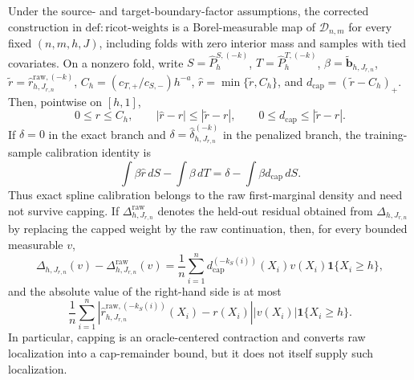 Under the source- and target-boundary-factor assumptions, the corrected construction in \(\mathrm{def:ricot\text{-}weights}\) is a Borel-measurable map of \(\mathcal D_{n,m}\) for every fixed \((n,m,h,J)\), including folds with zero interior mass and samples with tied covariates. On a nonzero fold, write \(S=\widehat P^{S,(-k)}_h\), \(T=\widehat P^{T,(-k)}_h\), \(\beta=\widetilde{\mathbf b}_{h,J_{r,n}}\), \(\widetilde r=\widehat r^{\mathrm{raw},(-k)}_{h,J_{r,n}}\), \(C_h=(c_{T,+}/c_{S,-})h^{-a}\), \(\widehat r=\min\{\widetilde r,C_h\}\), and \(d_{\mathrm{cap}}=(\widetilde r-C_h)_+\). Then, pointwise on \([h,1]\),
\[
0\le r\le C_h,\qquad |\widehat r-r|\le|\widetilde r-r|,
\qquad 0\le d_{\mathrm{cap}}\le|\widetilde r-r|.
\]
If \(\delta=0\) in the exact branch and \(\delta=\widehat\delta^{(-k)}_{h,J_{r,n}}\) in the penalized branch, the training-sample calibration identity is
\[
\int\beta\widehat r\,dS-\int\beta\,dT
=\delta-\int\beta d_{\mathrm{cap}}\,dS.
\]
Thus exact spline calibration belongs to the raw first-marginal density and need not survive capping. If \(\Delta^{\mathrm{raw}}_{h,J_{r,n}}\) denotes the held-out residual obtained from \(\Delta_{h,J_{r,n}}\) by replacing the capped weight by the raw continuation, then, for every bounded measurable \(v\),
\[
\Delta_{h,J_{r,n}}(v)-\Delta^{\mathrm{raw}}_{h,J_{r,n}}(v)
=\frac1n\sum_{i=1}^n d_{\mathrm{cap}}^{(-k_S(i))}(X_i)v(X_i)\mathbf 1\{X_i\ge h\},
\]
and the absolute value of the right-hand side is at most
\[
\frac1n\sum_{i=1}^n
\left|\widehat r^{\mathrm{raw},(-k_S(i))}_{h,J_{r,n}}(X_i)-r(X_i)\right|
|v(X_i)|\mathbf 1\{X_i\ge h\}.
\]
In particular, capping is an oracle-centered contraction and converts raw localization into a cap-remainder bound, but it does not itself supply such localization.